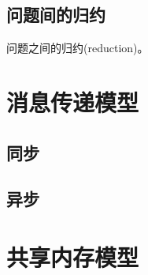 \subsection{问题间的归约}

问题之间的归约(reduction)。


\section{消息传递模型}

\subsection{同步}

\subsection{异步}


\section{共享内存模型}









